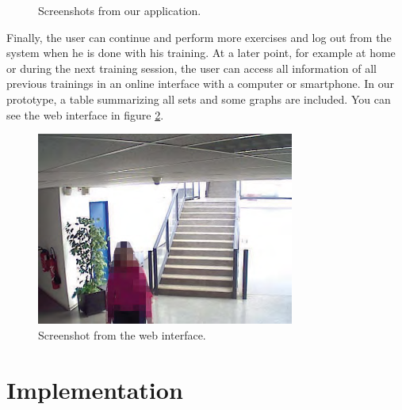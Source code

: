 \documentclass{tk3-team}
\begin{document}
\begin{figure}[!t]
{\label{fig_screen_execute_exercise}}
\hfil
{}
\caption{Screenshots from our application.}
\label{fig_screenshots}
\end{figure}

Finally, the user can continue and perform more exercises and log out from the system when he is done with his training. At a later point, for example at home or during the next training session, the user can access all information of all previous trainings in an online interface with a computer or smartphone. In our prototype, a table summarizing all sets and some graphs are included. You can see the web interface in figure \ref{fig_web_screenshot}.

\begin{figure}[!t]
\centering
\includegraphics[width=\textwidth]{img/sth}
\caption{Screenshot from the web interface. %
}
\label{fig_web_screenshot}
\end{figure}

\section{Implementation}
\end{document}
